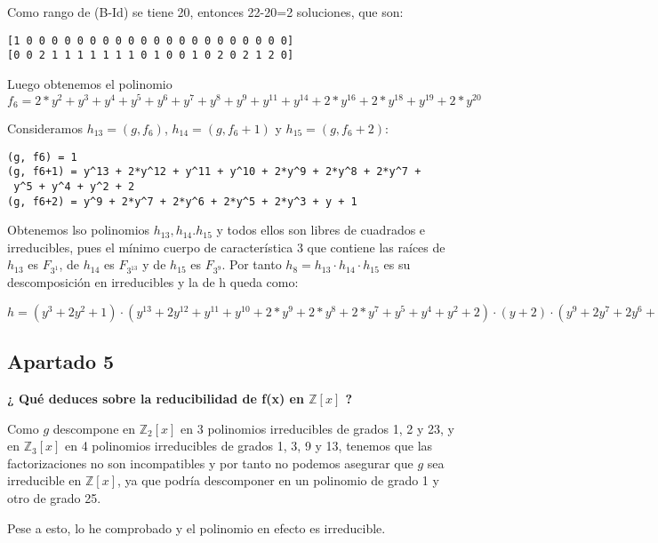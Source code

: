 \documentclass[a4paper]{article}
\begin{document}
Como rango de (B-Id) se tiene 20, entonces 22-20=2 soluciones, que son:

\begin{verbatim}
[1 0 0 0 0 0 0 0 0 0 0 0 0 0 0 0 0 0 0 0 0 0]
[0 0 2 1 1 1 1 1 1 1 0 1 0 0 1 0 2 0 2 1 2 0]
\end{verbatim}

Luego obtenemos el polinomio $f_6=2*y^2+y^3+y^4+y^5+y^6+y^7+y^8+y^9+y^11+y^14+2*y^16+2*y^18+y^19+2*y^20$

Consideramos $h_{13}=(g, f_6)$, $h_{14}=(g, f_6+1)$ y $h_{15}=(g, f_6+2)$:

\begin{verbatim}
(g, f6) = 1
(g, f6+1) = y^13 + 2*y^12 + y^11 + y^10 + 2*y^9 + 2*y^8 + 2*y^7 +
 y^5 + y^4 + y^2 + 2
(g, f6+2) = y^9 + 2*y^7 + 2*y^6 + 2*y^5 + 2*y^3 + y + 1
\end{verbatim}

Obtenemos lso polinomios $h_{13}, h_{14}. h_{15}$ y todos ellos son libres de cuadrados e irreducibles, pues el mínimo cuerpo de característica 3 que contiene las raíces de $h_{13}$ es $F_{3^{1}}$, de $h_{14}$ es $F_{3^{13}}$ y de $h_{15}$ es $F_{3^{9}}$. Por tanto $h_8=h_{13}\cdot h_{14}\cdot h_{15}$ es su descomposición en irreducibles y la de h queda como:

$h = (y^3 + 2y^2 + 1)\cdot (y^{13} + 2y^{12} + y^{11} + y^{10} + 2*y^9 + 2*y^8 + 2*y^7 + y^5 + y^4 + y^2 + 2)\cdot (y+2)\cdot (y^9 + 2y^7 + 2y^6 + 2y^5 + 2y^3 + y + 1)$


\subsection{Apartado 5}
\textbf{¿ Qué deduces sobre la reducibilidad de f(x) en $\mathbb{Z}[x]$ ?}

Como $g$ descompone en $\mathbb{Z}_2[x]$ en 3 polinomios irreducibles de grados 1, 2 y 23, y en $\mathbb{Z}_3[x]$ en 4 polinomios irreducibles de grados 1, 3, 9 y 13, tenemos que las factorizaciones no son incompatibles y por tanto no podemos asegurar que $g$ sea irreducible en $\mathbb{Z}[x]$, ya que podría descomponer en un polinomio de grado 1 y otro de grado 25.

Pese a esto, lo he comprobado y el polinomio en efecto es irreducible.
\end{document}
